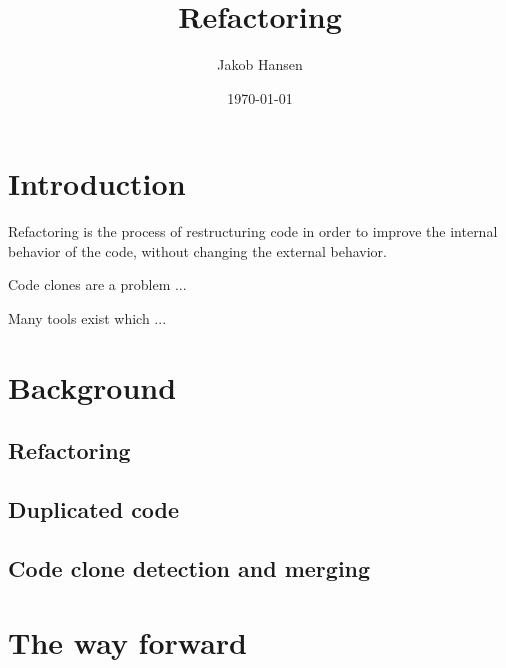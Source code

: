 \documentclass[12pt]{article}
\title{Refactoring}
\author{Jakob Hansen}
\date{\today}
\begin{document}
\maketitle

\tableofcontents

\section{Introduction}

Refactoring is the process of restructuring code in order to improve the internal behavior
of the code, without changing the external behavior.\cite{fowlerrefactoring}

Code clones are a problem ...

Many tools exist which ...

\section{Background}
\subsection{Refactoring}

\subsection{Duplicated code}

\subsection{Code clone detection and merging}

\section{The way forward}



\end{document}
